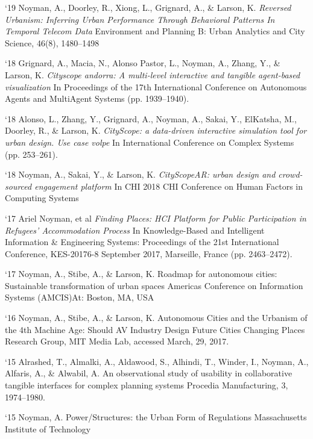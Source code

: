 \begin{tablist}
    \item[`19] \tab  Noyman, A., Doorley, R., Xiong, L., Grignard, A., \& Larson, K.
    \textit{Reversed Urbanism: Inferring Urban Performance Through Behavioral Patterns In Temporal Telecom Data}
    Environment and Planning B: Urban Analytics and City Science, 46(8), 1480–1498

    \item[`18] \tab  Grignard, A., Macia, N., Alonso Pastor, L., Noyman, A., Zhang, Y., \& Larson, K.
    \textit{Cityscope andorra: A multi-level interactive and tangible agent-based visualization}
    In Proceedings of the 17th International Conference on Autonomous Agents and MultiAgent Systems (pp. 1939–1940).

    \item[`18] \tab  Alonso, L., Zhang, Y., Grignard, A., Noyman, A., Sakai, Y., ElKatsha, M., Doorley, R., \& Larson, K.
    \textit{CityScope: a data-driven interactive simulation tool for urban design. Use case volpe}
    In International Conference on Complex Systems (pp. 253–261).

    \item[`18] \tab  Noyman, A., Sakai, Y., \& Larson, K.
    \textit{CityScopeAR: urban design and crowd-sourced engagement platform
    }In CHI 2018 CHI Conference on Human Factors in Computing Systems
    \item[`17] \tab  Ariel Noyman, et al
    \textit{Finding Places: HCI Platform for Public Participation in Refugees’ Accommodation Process}
    In Knowledge-Based and Intelligent Information \& Engineering Systems: Proceedings of the 21st International Conference, KES-20176-8 September 2017, Marseille, France (pp. 2463–2472).

    \item[`17] \tab  Noyman, A., Stibe, A., \& Larson, K.
    Roadmap for autonomous cities: Sustainable transformation of urban spaces
    Americas Conference on Information Systems (AMCIS)At: Boston, MA, USA

    \item[`16] \tab  Noyman, A., Stibe, A., \& Larson, K.
    Autonomous Cities and the Urbanism of the 4th Machine Age: Should AV Industry Design Future Cities
    Changing Places Research Group, MIT Media Lab, accessed March, 29, 2017.

    \item[`15] \tab  Alrashed, T., Almalki, A., Aldawood, S., Alhindi, T., Winder, I., Noyman, A., Alfaris, A., \& Alwabil, A.
    An observational study of usability in collaborative tangible interfaces for complex planning systems
    Procedia Manufacturing, 3, 1974–1980.

    \item[`15] \tab  Noyman, A.
    Power/Structures: the Urban Form of Regulations
    Massachusetts Institute of Technology

\end{tablist}


